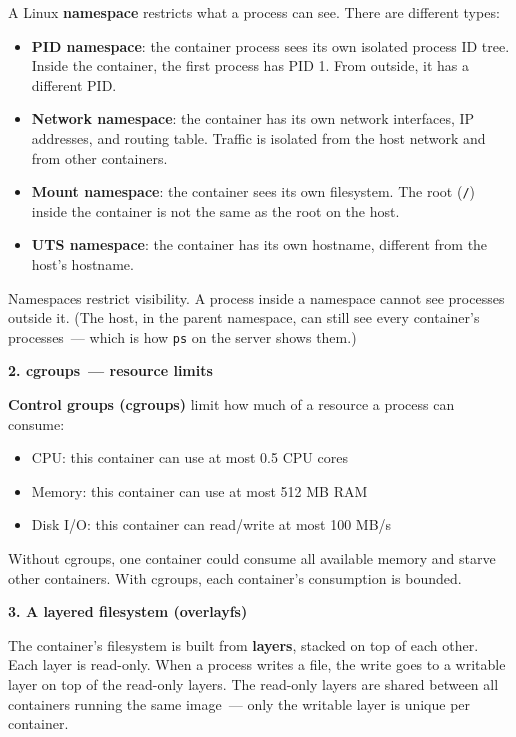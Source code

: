 A Linux \textbf{namespace} restricts what a process can see. There are different types:

\begin{itemize}
\tightlist
\item
  \textbf{PID namespace}: the container process sees its own isolated process ID tree. Inside the container, the first process has PID 1. From outside, it has a different PID.
\item
  \textbf{Network namespace}: the container has its own network interfaces, IP addresses, and routing table. Traffic is isolated from the host network and from other containers.
\item
  \textbf{Mount namespace}: the container sees its own filesystem. The root (\texttt{/}) inside the container is not the same as the root on the host.
\item
  \textbf{UTS namespace}: the container has its own hostname, different from the host's hostname.
\end{itemize}

\noindent{}Namespaces restrict visibility. A process inside a namespace cannot see processes outside it. (The host, in the parent namespace, can still see every container's processes~--- which is how \texttt{ps} on the server shows them.)

\textbf{2. cgroups~--- resource limits}

\textbf{Control groups (cgroups)} limit how much of a resource a process can consume:

\begin{itemize}
\tightlist
\item
  CPU: this container can use at most 0.5 CPU cores
\item
  Memory: this container can use at most 512 MB RAM
\item
  Disk I/O: this container can read/write at most 100 MB/s
\end{itemize}

\noindent{}Without cgroups, one container could consume all available memory and starve other containers. With cgroups, each container's consumption is bounded.

\textbf{3. A layered filesystem (overlayfs)}

The container's filesystem is built from \textbf{layers}, stacked on top of each other. Each layer is read-only. When a process writes a file, the write goes to a writable layer on top of the read-only layers. The read-only layers are shared between all containers running the same image~--- only the writable layer is unique per container.

